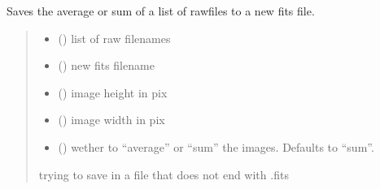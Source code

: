 \documentclass[letterpaper,10pt,english]{sphinxmanual}
\begin{document}
\begin{fulllineitems}
\label{\detokenize{micropolarray.processing:micropolarray.processing.convert.merge_rawfiles_to_fits}}
\pysigstartsignatures
{}
\pysigstopsignatures
\sphinxAtStartPar
Saves the average or sum of a list of rawfiles to a new fits file.
\begin{quote}\begin{description}
\begin{itemize}
\item {} 
\sphinxAtStartPar
{} () \textendash{} list of raw filenames

\item {} 
\sphinxAtStartPar
{} () \textendash{} new fits filename

\item {} 
\sphinxAtStartPar
{} () \textendash{} image height in pix

\item {} 
\sphinxAtStartPar
{} () \textendash{} image width in pix

\item {} 
\sphinxAtStartPar
{} () \textendash{} wether to “average” or “sum” the images. Defaults to “sum”.

\end{itemize}

\sphinxAtStartPar
{} \textendash{} trying to save in a file that does not end with .fits

\end{description}\end{quote}

\end{fulllineitems}
\end{document}

